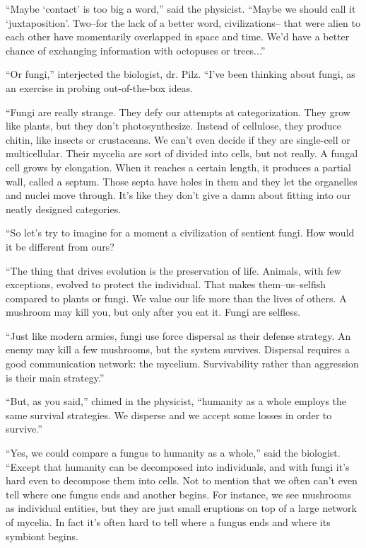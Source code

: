 \documentclass[12pt]{book}
\begin{document}
``Maybe `contact' is too big a word,'' said the physicist. ``Maybe we should call it `juxtaposition'. Two--for the lack of a better word, civilizations-- that were alien to each other have momentarily overlapped in space and time. We'd have a better chance of exchanging information with octopuses or trees...''

``Or fungi,'' interjected the biologist, dr. Pilz. ``I've been thinking about fungi, as an exercise in probing out-of-the-box ideas.

``Fungi are really strange. They defy our attempts at categorization. They grow like plants, but they don't photosynthesize. Instead of cellulose, they produce chitin, like insects or crustaceans. We can't even decide if they are single-cell or multicellular. Their mycelia are sort of divided into cells, but not really. A fungal cell grows by elongation. When it reaches a certain length, it produces a partial wall, called a septum. Those septa have holes in them and they let the organelles and nuclei move through. It's like they don't give a damn about fitting into our neatly designed categories. 

``So let's try to imagine for a moment a civilization of sentient fungi. How would it be different from ours?

``The thing that drives evolution is the preservation of life. Animals, with few exceptions, evolved to protect the individual. That makes them--us--selfish compared to plants or fungi. We value our life more than the lives of others. A mushroom may kill you, but only after you eat it. Fungi are selfless. 

``Just like modern armies, fungi use force dispersal as their defense strategy. An enemy may kill a few mushrooms, but the system survives. Dispersal requires a good communication network: the mycelium. Survivability rather than aggression is their main strategy.''

``But, as you said,'' chimed in the physicist, ``humanity as a whole employs the same survival strategies. We disperse and we accept some losses in order to survive.''

``Yes, we could compare a fungus to humanity as a whole,'' said the biologist. ``Except that humanity can be decomposed into individuals, and with fungi it's hard even to decompose them into cells. Not to mention that we often can't even tell where one fungus ends and another begins. For instance, we see mushrooms as individual entities, but they are just small eruptions on top of a large network of mycelia. In fact it's often hard to tell where a fungus ends and where its symbiont begins.
\end{document}
